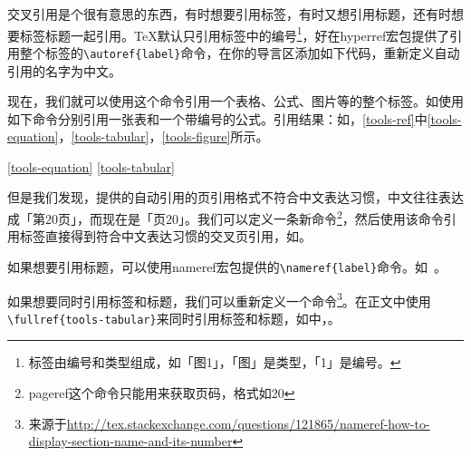 交叉引用是个很有意思的东西，有时想要引用标签，有时又想引用标题，还有时想要标签标题一起引用。\TeX{}默认只引用标签中的编号\footnote{标签由编号和类型组成，如「图1」，「图」是类型，「1」是编号。}，好在hyperref宏包提供了引用整个标签的\lstinline|\autoref{label}|命令，在你的导言区添加如下代码，重新定义自动引用的名字为中文。

\begin{latex}
\end{latex}

现在，我们就可以使用这个命令引用一个表格、公式、图片等的整个标签。如使用如下命令分别引用一张表和一个带编号的公式。引用结果：如，\autoref{tools-ref}中\autoref{tools-equation}，\autoref{tools-tabular}，\autoref{tools-figure}所示。

\begin{latex}
\ref{tools-equation}
\ref{tools-tabular}
\end{latex}

但是我们发现，提供的自动引用的页引用格式不符合中文表达习惯，中文往往表达成「第20页」，而现在是「页20」。我们可以定义一条新命令\footnote{pageref这个命令只能用来获取页码，格式如20}，然后使用该命令引用标签直接得到符合中文表达习惯的交叉页引用，如。

\begin{latex}
\newcommand*{\refpage}[1]{第~\pageref{#1}~页}
\end{latex}

如果想要引用标题，可以使用nameref宏包提供的\lstinline|\nameref{label}|命令。如~。

如果想要同时引用标签和标题，我们可以重新定义一个命令\footnote{来源于\url{http://tex.stackexchange.com/questions/121865/nameref-how-to-display-section-name-and-its-number}}。在正文中使用\lstinline|\fullref{tools-tabular}|来同时引用标签和标题，如中，。

\begin{latex}
\newcommand*{\fullref}[1]{\hyperref[{#1}]{\autoref*{#1} \nameref*{#1}}}
\end{latex}

